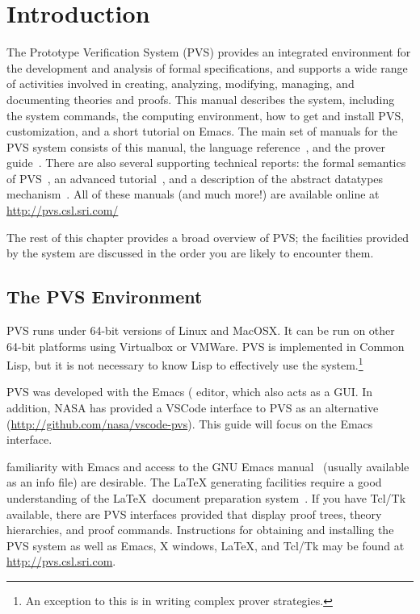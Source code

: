 \chapter{Introduction}
\label{introduction}

The Prototype Verification System (PVS) provides an integrated environment for the development and
analysis of formal specifications, and supports a wide range of activities
involved in creating, analyzing, modifying, managing, and documenting
theories and proofs.  This manual describes the system, including the
system commands, the computing environment, how to get and install PVS,
customization, and a short tutorial on Emacs.  The main set of manuals
for the PVS system consists of this manual, the language
reference~\cite{PVS:language}, and the prover guide~\cite{PVS:prover}.
There are also several supporting technical reports: the formal semantics
of PVS~\cite{PVS:semantics}, an advanced
tutorial~\cite{Rushby&Stringer-Calvert95}, and a description of the
abstract datatypes mechanism~\cite{PVS-ADT:TR}.  All of these manuals (and
much more!) are available online at \url{http://pvs.csl.sri.com/}

The rest of this chapter provides a broad overview of PVS; the facilities
provided by the system are discussed in the order you are likely to
encounter them.

\section*{The PVS Environment}

PVS runs under 64-bit versions of Linux and MacOSX.  It can be run on
other 64-bit platforms using Virtualbox or VMWare.  PVS is implemented in
Common Lisp, but it is not necessary to know Lisp to
effectively use the system.\footnote{An exception to this is in writing
  complex prover strategies.}

PVS was developed with the Emacs (\gnuemacs{} editor, which
also acts as a GUI. In addition, NASA has provided a VSCode interface to
PVS as an alternative (\url{http://github.com/nasa/vscode-pvs}). This
guide will focus on the Emacs interface.

familiarity with Emacs and access to
the GNU Emacs manual~\cite{emacs20} (usually available as an info file)
are desirable.
The \LaTeX{} generating facilities require a good
understanding of the \LaTeX\ document preparation system~\cite{latex2e}.
If you have Tcl/Tk available, there are PVS interfaces provided that
display proof trees, theory hierarchies, and proof commands.  Instructions
for obtaining and installing
the PVS system as well as Emacs, X windows, \LaTeX, and Tcl/Tk may be
found at \url{http://pvs.csl.sri.com}.


